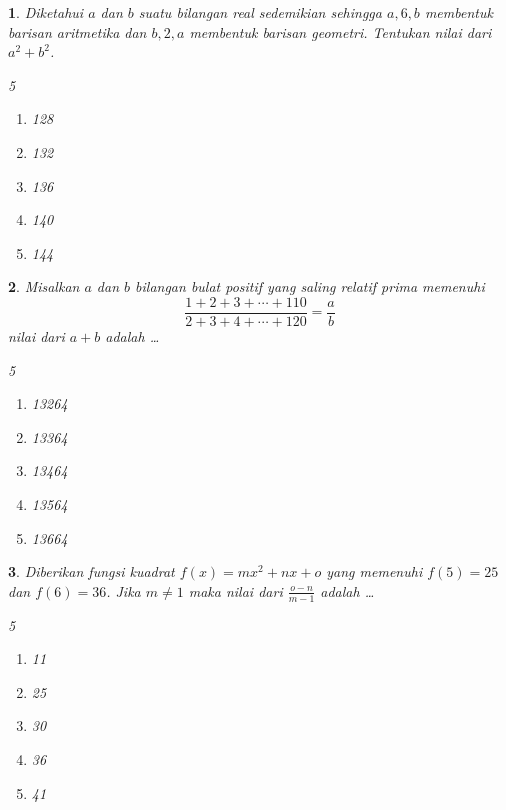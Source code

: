 \documentclass[11pt,a4paper,DIV=12]{scrartcl}
\theoremstyle{problemstyle}
\newtheorem{problem}{}
\theoremstyle{answerstyle}
\begin{document}
\begin{problem}
  Diketahui $a$ dan $b$ suatu bilangan real sedemikian sehingga $a, 6, b$ membentuk barisan aritmetika dan $b, 2, a$ membentuk barisan geometri. Tentukan nilai dari $a^2 + b^2$.
  \begin{multicols}{5}
    \begin{enumerate}[label=(\Alph*)]
      \item 128
      \item 132
      \item 136
      \item 140
      \item 144
    \end{enumerate}
  \end{multicols}
\end{problem}

\begin{problem}
  Misalkan $a$ dan $b$ bilangan bulat positif yang saling relatif prima memenuhi
  \[
    \frac{1 + 2 + 3 + \cdots + 110}{2 + 3 + 4 + \cdots + 120} = \frac{a}{b}
  \]
  nilai dari $a + b$ adalah \dots
  \begin{multicols}{5}
    \begin{enumerate}[label=(\Alph*)]
      \item 13264
      \item 13364
      \item 13464
      \item 13564
      \item 13664
    \end{enumerate}
  \end{multicols}
\end{problem}

\begin{problem}
  Diberikan fungsi kuadrat $f(x) = mx^2 + nx + o$ yang memenuhi $f(5) = 25$ dan $f(6) = 36$. Jika $m \neq 1$ maka nilai dari $\frac{o - n}{m - 1}$ adalah \dots
  \begin{multicols}{5}
    \begin{enumerate}[label=(\Alph*)]
      \item 11
      \item 25
      \item 30
      \item 36
      \item 41
    \end{enumerate}
  \end{multicols}
\end{problem}
\end{document}
